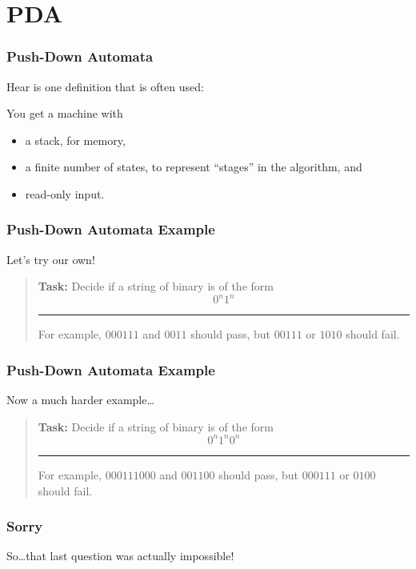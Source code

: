 \documentclass[mathserif]{beamer}
\begin{document}
\section{PDA}
\begin{frame}
  \frametitle{Push-Down Automata}

  Hear is one definition that is often used:

  You get a machine with
  \begin{itemize}
    \item a stack, for memory,
    \item a finite number of states, to represent ``stages'' in the algorithm,
      and
    \item read-only input.
  \end{itemize}
\end{frame}

\begin{frame}
  \frametitle{Push-Down Automata Example}
  Let's try our own!

  \begin{quote}
    \textbf{Task:} Decide if a string of binary is of the form 
      \[ 0^n1^n \]

    \hrule

    \vspace{5mm}

    For example, $000111$ and $0011$ should pass, but $00111$ or $1010$ should
    fail.
  \end{quote}
\end{frame}

\begin{frame}
  \frametitle{Push-Down Automata Example}
  Now a much harder example\ldots

  \begin{quote}
    \textbf{Task:} Decide if a string of binary is of the form
    \[0^n1^n0^n\]
    
    \hrule

    \vspace{5mm}


    For example, $000111000$ and $001100$ should pass, but $000111$ or $0100$
    should fail.
  \end{quote}
\end{frame}

\begin{frame}
  \frametitle{Sorry}

  \centerline{So\ldots that last question was actually impossible!}
\end{frame}
\end{document}
